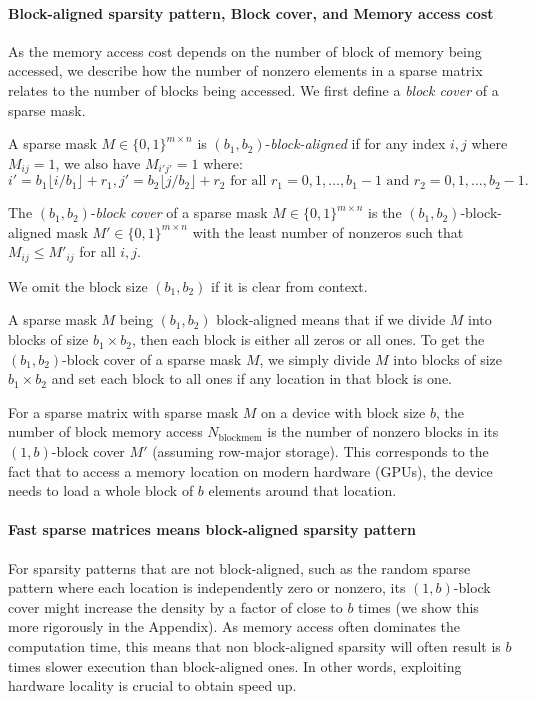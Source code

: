 \paragraph{Block-aligned sparsity pattern, Block cover, and Memory access cost}
As the memory access cost depends on the number of block of memory being accessed, we describe how the number of nonzero elements in a sparse matrix relates to the number of blocks being accessed.
We first define a \emph{block cover} of a sparse mask.
\begin{definition}
  A sparse mask $M \in \{ 0, 1 \}^{m \times n}$ is $(b_1, b_2)$-\emph{block-aligned} if for any index $i, j$ where $M_{ij} = 1$, we also have $M_{i'j'} = 1$ where:
  \begin{equation*}
     i' = b_1 \lfloor i / b_1 \rfloor + r_1, j' = b_2 \lfloor j / b_2 \rfloor + r_2 \text{ for all } r_1 = 0, 1, \dots, b_1 - 1 \text{ and } r_2 = 0, 1, \dots, b_2 - 1.
  \end{equation*}

  The $(b_1, b_2)$-\emph{block cover} of a sparse mask $M \in \{ 0, 1 \}^{m \times n}$ is the $(b_1, b_2)$-block-aligned mask $M' \in \{ 0, 1 \}^{m \times n}$ with the least number of nonzeros such that $M_{ij} \leq M'_{ij}$ for all $i, j$.
\end{definition}
We omit the block size $(b_1, b_2)$ if it is clear from context.

A sparse mask $M$ being $(b_1, b_2)$ block-aligned means that if we divide $M$ into blocks of size $b_1 \times b_2$, then each block is either all zeros or all ones.
To get the $(b_1, b_2)$-block cover of a sparse mask $M$, we simply divide $M$ into blocks of size $b_1 \times b_2$ and set each block to all ones if any location in that block is one.


For a sparse matrix with sparse mask $M$ on a device with block size $b$, the number of block memory access $N_\mathrm{block mem}$ is the number of nonzero blocks in its $(1, b)$-block cover $M'$ (assuming row-major storage).
This corresponds to the fact that to access a memory location on modern hardware (GPUs), the device needs to load a whole block of $b$ elements around that location.

\paragraph{Fast sparse matrices means block-aligned sparsity pattern}
For sparsity patterns that are not block-aligned, such as the random sparse pattern where each location is independently zero or nonzero, its $(1, b)$-block cover might increase the density by a factor of close to $b$ times (we show this more rigorously in the Appendix).
As memory access often dominates the computation time, this means that non block-aligned sparsity will often result is $b$ times slower execution than block-aligned ones.
In other words, exploiting hardware locality is crucial to obtain speed up.

